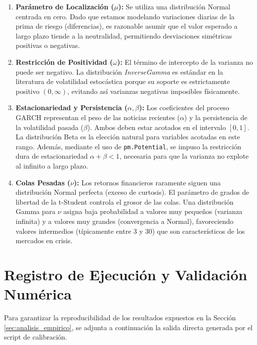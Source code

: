 \begin{enumerate}
    \item \textbf{Parámetro de Localización ($\mu$):} Se utiliza una distribución Normal centrada en cero. Dado que estamos modelando variaciones diarias de la prima de riesgo (diferencias), es razonable asumir que el valor esperado a largo plazo tiende a la neutralidad, permitiendo desviaciones simétricas positivas o negativas.
    
    \item \textbf{Restricción de Positividad ($\omega$):} El término de intercepto de la varianza no puede ser negativo. La distribución \textit{InverseGamma} es estándar en la literatura de volatilidad estocástica porque su soporte es estrictamente positivo $(0, \infty)$, evitando así varianzas negativas imposibles físicamente.
    
    \item \textbf{Estacionariedad y Persistencia ($\alpha, \beta$):} Los coeficientes del proceso GARCH representan el peso de las noticias recientes ($\alpha$) y la persistencia de la volatilidad pasada ($\beta$). Ambos deben estar acotados en el intervalo $[0, 1]$. La distribución Beta es la elección natural para variables acotadas en este rango. Además, mediante el uso de \texttt{pm.Potential}, se impuso la restricción dura de estacionariedad $\alpha + \beta < 1$, necesaria para que la varianza no explote al infinito a largo plazo.
    
    \item \textbf{Colas Pesadas ($\nu$):} Los retornos financieros raramente siguen una distribución Normal perfecta (exceso de curtosis). El parámetro de grados de libertad de la t-Student controla el grosor de las colas. Una distribución Gamma para $\nu$ asigna baja probabilidad a valores muy pequeños (varianza infinita) y a valores muy grandes (convergencia a Normal), favoreciendo valores intermedios (típicamente entre 3 y 30) que son característicos de los mercados en crisis.
\end{enumerate}

\section{Registro de Ejecución y Validación Numérica}
\label{app:log_terminal}

Para garantizar la reproducibilidad de los resultados expuestos en la Sección \ref{sec:analisis_empirico}, se adjunta a continuación la salida directa generada por el script de calibración. 

